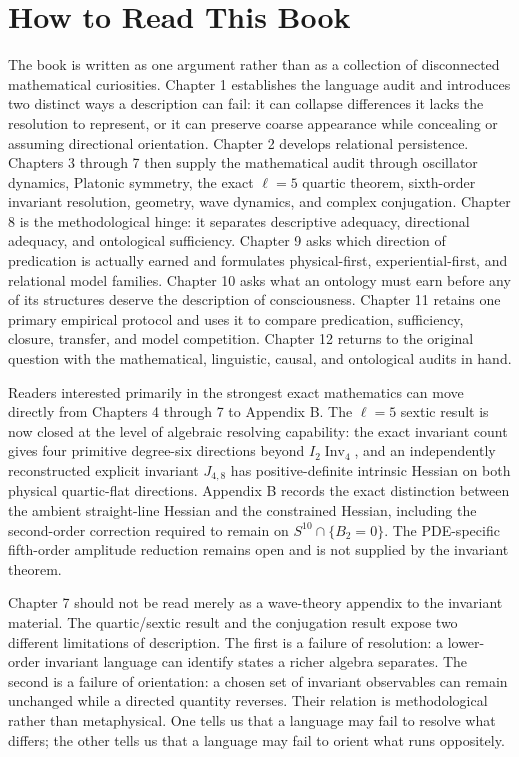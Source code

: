 \chapter*{How to Read This Book}

The book is written as one argument rather than as a collection of disconnected mathematical curiosities. Chapter 1 establishes the language audit and introduces two distinct ways a description can fail: it can collapse differences it lacks the resolution to represent, or it can preserve coarse appearance while concealing or assuming directional orientation. Chapter 2 develops relational persistence. Chapters 3 through 7 then supply the mathematical audit through oscillator dynamics, Platonic symmetry, the exact $\ell=5$ quartic theorem, sixth-order invariant resolution, geometry, wave dynamics, and complex conjugation. Chapter 8 is the methodological hinge: it separates descriptive adequacy, directional adequacy, and ontological sufficiency. Chapter 9 asks which direction of predication is actually earned and formulates physical-first, experiential-first, and relational model families. Chapter 10 asks what an ontology must earn before any of its structures deserve the description of consciousness. Chapter 11 retains one primary empirical protocol and uses it to compare predication, sufficiency, closure, transfer, and model competition. Chapter 12 returns to the original question with the mathematical, linguistic, causal, and ontological audits in hand.

Readers interested primarily in the strongest exact mathematics can move directly from Chapters 4 through 7 to Appendix B. The $\ell=5$ sextic result is now closed at the level of algebraic resolving capability: the exact invariant count gives four primitive degree-six directions beyond $I_2\operatorname{Inv}_4$, and an independently reconstructed explicit invariant $J_{4,8}$ has positive-definite intrinsic Hessian on both physical quartic-flat directions. Appendix B records the exact distinction between the ambient straight-line Hessian and the constrained Hessian, including the second-order correction required to remain on $S^{10}\cap\{B_2=0\}$. The PDE-specific fifth-order amplitude reduction remains open and is not supplied by the invariant theorem.

Chapter 7 should not be read merely as a wave-theory appendix to the invariant material. The quartic/sextic result and the conjugation result expose two different limitations of description. The first is a failure of resolution: a lower-order invariant language can identify states a richer algebra separates. The second is a failure of orientation: a chosen set of invariant observables can remain unchanged while a directed quantity reverses. Their relation is methodological rather than metaphysical. One tells us that a language may fail to resolve what differs; the other tells us that a language may fail to orient what runs oppositely.

